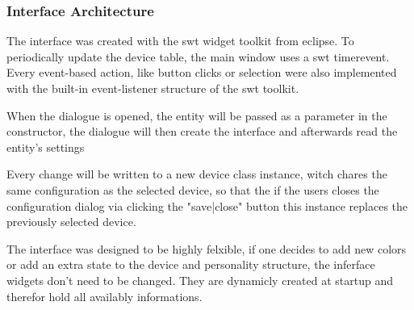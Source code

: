 \subsubsection{Interface Architecture}
The interface was created with the swt widget toolkit from eclipse. %
To periodically update the device table, the main window uses a swt timerevent. Every event-based action, like button clicks or selection were also implemented with the built-in event-listener structure of the swt toolkit. %

When the dialogue is opened, the entity will be passed as a parameter in the constructor, the dialogue will then create the interface and afterwards read the entity's settings %

Every change will be written to a new device class instance, witch chares the same configuration as the selected device, so that the if the users closes the configuration dialog via clicking the "save|close" button this instance replaces the previously selected device.

The interface was designed to be highly felxible, if one decides to add new colors or add an extra state to the device and personality structure, the inferface widgets don't need to be changed. They are dynamicly created at startup and therefor hold all availably informations.

